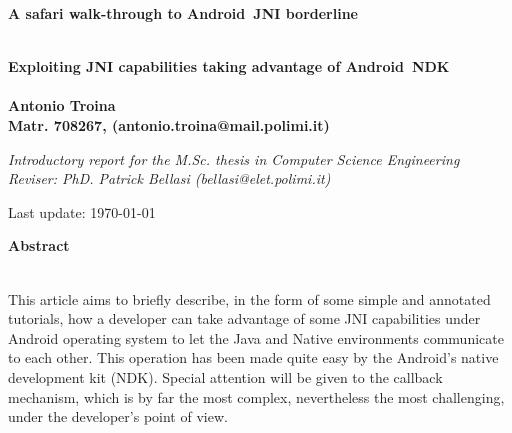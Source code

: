 \documentclass[a4paper,10pt]{article}
\newenvironment*{mytitle}{\begin{LARGE}\bf}{\end{LARGE}\\}%
\newenvironment*{mysubtitle}{\bf}{\\[1.5ex]}%
\newenvironment*{myabstract}{\begin{Large}\bf}{\end{Large}\\[2.5ex]}%
\begin{document}
\begin{mytitle}A safari walk-through to Android\texttrademark \ JNI borderline\end{mytitle}
\begin{mysubtitle}
Exploiting JNI capabilities taking advantage of Android\texttrademark \ NDK
\end{mysubtitle}
%
%
\\
Antonio Troina\\
Matr. 708267, (antonio.troina@mail.polimi.it)\\
\hspace{10ex}
\begin{flushright}
\emph{Introductory report for the M.Sc. thesis in Computer Science Engineering}\\
\emph{Reviser: PhD. Patrick Bellasi (bellasi@elet.polimi.it)}
\end{flushright}

Last update: \today
\\
\hspace{10ex}

\begin{myabstract} Abstract \end{myabstract}
This article aims to briefly describe, in the form of some simple and annotated
tutorials, how a developer can take advantage of some JNI capabilities under
Android operating system to let the Java and Native environments communicate to
each other. This operation has been made quite easy by the Android's native
development kit (NDK). Special attention will be given to the callback mechanism, 
which is by far the most complex, nevertheless the most challenging, under the
developer's point of view.
\end{document}
